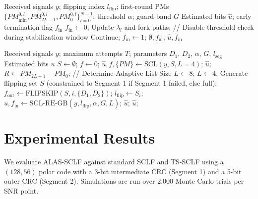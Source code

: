 \documentclass[journal,twocolumn]{IEEEtran}
\begin{document}
\begin{algorithm}
\caption{SCL-RE-GB: SCL Early Termination with Guard-Band}
\begin{algorithmic}[1]
\INPUT Received signals $y$; flipping index $l_{\text{flip}}$; first-round PMs $\{PM_{\text{min}}^{0, l}, PM_{2L-1}^{0, l}, PM_{0}^{0, l}\}_{l=0}^{N-1}$; threshold $\alpha$; guard-band $G$
\OUTPUT Estimated bits $\hat{u}$; early termination flag $f_{\text{in}}$
\STATE $f_{\text{in}} \leftarrow 0$;
\STATE Update $\lambda_l$ and fork paths;
\STATE // Disable threshold check during stabilization window
\STATE Continue;
\ELSE
{}
\STATE $f_{\text{in}} \leftarrow 1$; \RETURN $\emptyset, f_{\text{in}}$;
\ENDIF
\ENDIF
\ENDFOR
\RETURN $\hat{u}, f_{\text{in}}$
\end{algorithmic}
\end{algorithm}

\begin{algorithm}
\caption{Proposed ALAS-SCLF Decoder}
\begin{algorithmic}[1]
\INPUT Received signals $y$; maximum attempts $T$; parameters $D_1$, $D_2$, $\alpha$, $G$, $l_{\text{seg}}$
\OUTPUT Estimated bits $u$
\STATE $S \leftarrow \emptyset$; $f \leftarrow 0$;
\STATE $\hat{u}, f, \{PM\} \leftarrow \text{SCL}(y, S, L=4)$;
\RETURN $\hat{u}$;
\ENDIF
\STATE $R \leftarrow PM_{2L-1} - PM_0$;
\STATE // Determine Adaptive List Size
\STATE $L \leftarrow 8$;
\ELSE
\STATE $L \leftarrow 4$;
\ENDIF
\STATE Generate flipping set $S$ (constrained to Segment 1 if Segment 1 failed, else full);
\STATE $f_{\text{out}} \leftarrow \text{FLIPSKIP}(S, i, \{D_1, D_2\})$;
\STATE $l_{\text{flip}} \leftarrow S_i$;
\STATE $\hat{u}, f_{\text{in}} \leftarrow \text{SCL-RE-GB}(y, l_{\text{flip}}, \alpha, G, L)$;
\RETURN $\hat{u}$;
\ENDIF
\ENDIF
\ENDFOR
\RETURN $\hat{u}$;
\end{algorithmic}
\end{algorithm}

\section{Experimental Results}
We evaluate ALAS-SCLF against standard SCLF and TS-SCLF using a $(128, 56)$ polar code with a 3-bit intermediate CRC (Segment 1) and a 5-bit outer CRC (Segment 2). Simulations are run over 2,000 Monte Carlo trials per SNR point.
\end{document}

